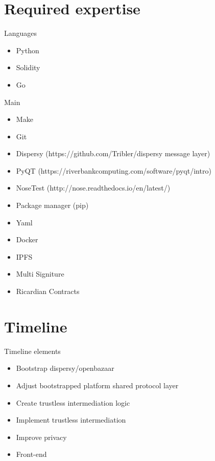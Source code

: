 \documentclass[11pt]{article}
\begin{document}

\section{Required expertise}

Languages
\begin{itemize}
    \item Python
    \item Solidity
    \item Go
\end{itemize}

\noindent Main
\begin{itemize}
    \item Make
    \item Git
    \item Dispersy (https://github.com/Tribler/dispersy message layer)
    \item PyQT (https://riverbankcomputing.com/software/pyqt/intro)
    \item NoseTest (http://nose.readthedocs.io/en/latest/)
    \item Package manager (pip)
    \item Yaml
    \item Docker
    \item IPFS
    \item Multi Signiture
    \item Ricardian Contracts
\end{itemize}

\section{Timeline}

Timeline elements
\begin{itemize}
  \item Bootstrap dispersy/openbazaar
  \item Adjust bootstrapped platform shared protocol layer
  \item Create trustless intermediation logic
  \item Implement trustless intermediation
  \item Improve privacy
  \item Front-end
\end{itemize}
\end{document}
